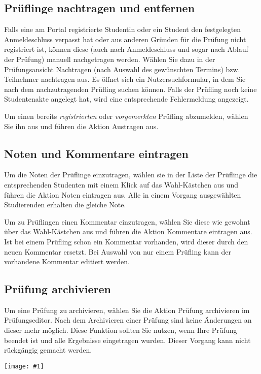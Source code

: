 \documentclass[a4paper,11pt]{article}
\newcommand{\bild}[1]{
    \begin{center}\texttt{[image: \#1]}\end{center}
}
\newcommand{\knopf}[1]{{\sc #1}}
\begin{document}
\subsection{Prüflinge nachtragen und entfernen}

Falls eine am Portal registrierte Studentin oder ein Student den festgelegten Anmeldeschluss
verpasst hat oder aus anderen Gründen für die Prüfung nicht registriert ist,
können diese (auch nach Anmeldeschluss und sogar nach Ablauf der Prüfung)
manuell nachgetragen werden. Wählen Sie dazu in der Prüfungsansicht \knopf{Nachtragen}
(nach Auswahl des gewünschten Termins) bzw. \knopf{Teilnehmer nachtragen}
aus. Es öffnet sich ein Nutzersuchformular, in dem Sie nach dem
nachzutragenden Prüfling suchen können. Falls der Prüfling
noch keine Studentenakte angelegt hat, wird eine entsprechende
Fehlermeldung angezeigt.

Um einen bereits {\em registrierten} oder {\em vorgemerkten} Prüfling abzumelden, wählen
Sie ihn aus und führen die Aktion \knopf{Austragen} aus.

\subsection{Noten und Kommentare eintragen}

Um die Noten der Prüflinge einzutragen, wählen sie in der Liste der Prüflinge
die entsprechenden Studenten mit einem
Klick auf das Wahl-Kästchen aus und führen die Aktion \knopf{Noten
  eintragen} aus. Alle in einem Vorgang ausgewählten Studierenden erhalten die
gleiche Note.

Um zu Prüflingen einen Kommentar einzutragen, wählen Sie diese
wie gewohnt über das Wahl-Kästchen aus und führen die Aktion \knopf{Kommentare
 eintragen} aus. Ist bei einem Prüfling schon ein Kommentar vorhanden,
wird dieser durch den neuen Kommentar ersetzt. Bei Auswahl von nur einem
Prüfling kann der vorhandene Kommentar editiert werden.

\subsection{Prüfung archivieren}

Um eine Prüfung zu archivieren, wählen Sie die Aktion \knopf{Prüfung archivieren}
im Prüfungseditor. Nach dem Archivieren einer Prüfung sind keine Änderungen an
dieser mehr möglich. Diese Funktion sollten Sie nutzen, wenn Ihre Prüfung beendet
ist und alle Ergebnisse eingetragen wurden. Dieser Vorgang kann nicht rückgängig
gemacht werden.

\bild{exam-archive}
\end{document}
